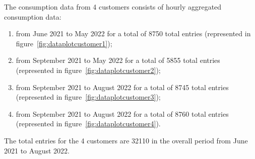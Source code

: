 The consumption data from 4 customers consists of hourly aggregated consumption data:
\begin{enumerate}
  \item from June 2021 to May 2022 for a total of 8750 total entries (represented in figure~\ref{fig:dataplotcustomer1});
  \item from September 2021 to May 2022 for a total of 5855 total entries (represented in figure~\ref{fig:dataplotcustomer2});
  \item from September 2021 to August 2022 for a total of 8745 total entries (represented in figure~\ref{fig:dataplotcustomer3});
  \item from September 2021 to August 2022 for a total of 8760 total entries (represented in figure~\ref{fig:dataplotcustomer4}).
\end{enumerate}
The total entries for the 4 customers are 32110 in the overall period from June 2021 to August 2022.

